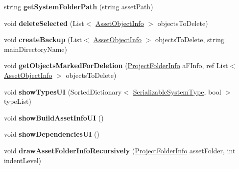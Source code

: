 \begin{DoxyCompactItemize}
\item 
\mbox{\label{class_asset_hunter_main_window_a1a7ae23fe8a230dd4ad84768a767c9c7}} 
string {\bfseries get\+System\+Folder\+Path} (string asset\+Path)
\item 
\mbox{\label{class_asset_hunter_main_window_a53d6e5c484cfdc18eeb65e97978da281}} 
void {\bfseries delete\+Selected} (List$<$ \hyperlink{class_heureka_games_1_1_asset_object_info}{Asset\+Object\+Info} $>$ objects\+To\+Delete)
\item 
\mbox{\label{class_asset_hunter_main_window_aa3b1f0cbb785f136ba8f44a1b668b88d}} 
void {\bfseries create\+Backup} (List$<$ \hyperlink{class_heureka_games_1_1_asset_object_info}{Asset\+Object\+Info} $>$ objects\+To\+Delete, string main\+Directory\+Name)
\item 
\mbox{\label{class_asset_hunter_main_window_a0cd5c22ce9ed9f2d2758bfa0a39a71f7}} 
void {\bfseries get\+Objects\+Marked\+For\+Deletion} (\hyperlink{class_heureka_games_1_1_project_folder_info}{Project\+Folder\+Info} a\+F\+Info, ref List$<$ \hyperlink{class_heureka_games_1_1_asset_object_info}{Asset\+Object\+Info} $>$ objects\+To\+Delete)
\item 
\mbox{\label{class_asset_hunter_main_window_ad21819ee1b441b6f9c34a1b7cba62128}} 
void {\bfseries show\+Types\+UI} (Sorted\+Dictionary$<$ \hyperlink{class_heureka_games_1_1_serializable_system_type}{Serializable\+System\+Type}, bool $>$ type\+List)
\item 
\mbox{\label{class_asset_hunter_main_window_add0163f6ac9990dae3fce64e324c537b}} 
void {\bfseries show\+Build\+Asset\+Info\+UI} ()
\item 
\mbox{\label{class_asset_hunter_main_window_ae137f27aff76d3847b4f0958b36f9edd}} 
void {\bfseries show\+Dependencies\+UI} ()
\item 
\mbox{\label{class_asset_hunter_main_window_acbd1a2ac572ff9c87d63c71b7a0cc58b}} 
void {\bfseries draw\+Asset\+Folder\+Info\+Recursively} (\hyperlink{class_heureka_games_1_1_project_folder_info}{Project\+Folder\+Info} asset\+Folder, int indent\+Level)

\end{DoxyCompactItemize}
